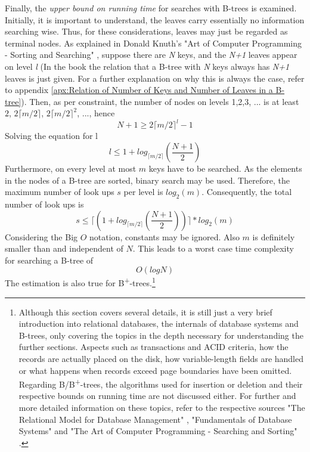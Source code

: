 Finally, the \emph{upper bound on running time} for searches with B-trees is examined. Initially, it is important to understand, the leaves carry essentially no information searching wise. Thus, for these considerations, leaves may just be regarded as terminal nodes. As explained in Donald Knuth's "Art of Computer Programming - Sorting and Searching" \cite{SortingSearchingBible}, suppose there are \emph{N} keys, and the \emph{N+1} leaves appear on level \emph{l} (In the book the relation that a B-tree with \emph{N} keys always has \emph{N+1} leaves is just given. For a further explanation on why this is always the case, refer to appendix \ref{apx:Relation of Number of Keys and Number of Leaves in a B-tree}). Then, as per constraint, the number of nodes on levels 1,2,3, ... is at least $2$, $2 \lceil m/2 \rceil$, $2 \lceil m/2 \rceil ^2$, ..., hence
$$ N + 1 \geq 2 \lceil m/2 \rceil ^l-1 $$
Solving the equation for l
$$ l \leq 1 + log_{\lceil m/2 \rceil}(\frac{N + 1}{2}) $$
Furthermore, on every level at most $m$ keys have to be searched. As the elements in the nodes of a B-tree are sorted, binary search may be used. Therefore, the maximum number of look ups $s$ per level is $log_2(m)$. Consequently, the total number of look ups is 
$$ s \leq \lceil (1 + log_{\lceil m/2 \rceil}(\frac{N + 1}{2})) \rceil * log_2(m) $$ 
Considering the Big $O$ notation, constants may be ignored. Also $m$ is definitely smaller than and independent of $N$. This leads to a worst case time complexity for searching a B-tree of 
$$ O(log N) $$ 
The estimation is also true for B\textsuperscript{+}-trees.\footnote{Although this section covers several details, it is still just a very brief introduction into relational databases, the internals of database systems and B-trees, only covering the topics in the depth necessary for understanding the further sections. Aspects such as transactions and ACID criteria, how the records are actually placed on the disk, how variable-length fields are handled or what happens when records exceed page boundaries have been omitted. Regarding B/B\textsuperscript{+}-trees, the algorithms used for insertion or deletion and their respective bounds on running time are not discussed either. For further and more detailed information on these topics, refer to the respective sources "The Relational Model for Database Management" \cite{RelationalDatabaseModel}, "Fundamentals of Database Systems" \cite{DatabaseFundamentals} and "The Art of Computer Programming - Searching and Sorting" \cite{SortingSearchingBible}.}

